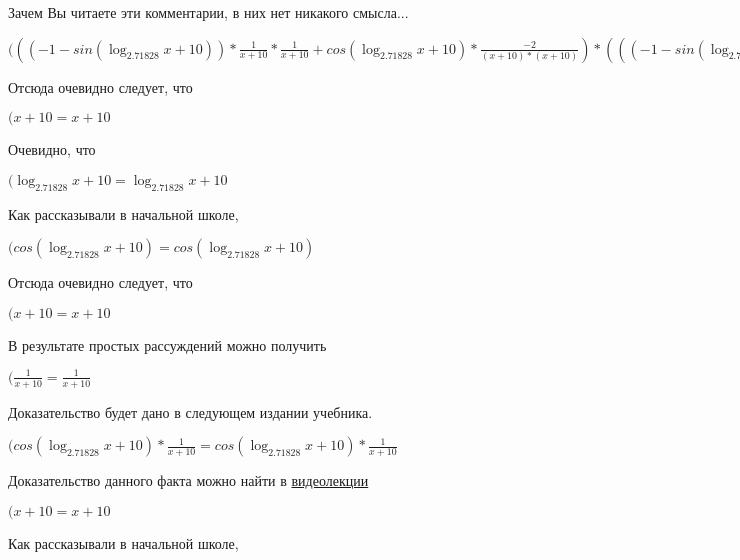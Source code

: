 \documentclass[12pt,a4paper,fleqn]{article}
\theoremstyle{definition}
\begin{document}
Зачем Вы читаете эти комментарии, в них нет никакого смысла...

$((( -1  - sin(\log_{ 2.71828 }{ x  +  10 })) * \frac{ 1 }{ x  +  10 }
 * \frac{ 1 }{ x  +  10 }
 + cos(\log_{ 2.71828 }{ x  +  10 }) * \frac{ -2 }{( x  +  10 ) * ( x  +  10 )}
) * ((( -1  - sin(\log_{ 2.71828 }{ x  +  10 })) * \frac{ 1 }{ x  +  10 }
 * \frac{ 1 }{ x  +  10 }
 + cos(\log_{ 2.71828 }{ x  +  10 }) * \frac{ -2 }{( x  +  10 ) * ( x  +  10 )}
) * { 3 }^{sin(\log_{ 2.71828 }{ x  +  10 })} + cos(\log_{ 2.71828 }{ x  +  10 }) * \frac{ 1 }{ x  +  10 }
 * cos(\log_{ 2.71828 }{ x  +  10 }) * \frac{ 1 }{ x  +  10 }
 * { 3 }^{sin(\log_{ 2.71828 }{ x  +  10 })}) = (( -1  - sin(\log_{ 2.71828 }{ x  +  10 })) * \frac{ 1 }{ x  +  10 }
 * \frac{ 1 }{ x  +  10 }
 + cos(\log_{ 2.71828 }{ x  +  10 }) * \frac{ -2 }{( x  +  10 ) * ( x  +  10 )}
) * ((( -1  - sin(\log_{ 2.71828 }{ x  +  10 })) * \frac{ 1 }{ x  +  10 }
 * \frac{ 1 }{ x  +  10 }
 + cos(\log_{ 2.71828 }{ x  +  10 }) * \frac{ -2 }{( x  +  10 ) * ( x  +  10 )}
) * { 3 }^{sin(\log_{ 2.71828 }{ x  +  10 })} + cos(\log_{ 2.71828 }{ x  +  10 }) * \frac{ 1 }{ x  +  10 }
 * cos(\log_{ 2.71828 }{ x  +  10 }) * \frac{ 1 }{ x  +  10 }
 * { 3 }^{sin(\log_{ 2.71828 }{ x  +  10 })})$

Отсюда очевидно следует, что

$( x  +  10  =  x  +  10 $

Очевидно, что

$(\log_{ 2.71828 }{ x  +  10 } = \log_{ 2.71828 }{ x  +  10 }$

Как рассказывали в начальной школе,

$(cos(\log_{ 2.71828 }{ x  +  10 }) = cos(\log_{ 2.71828 }{ x  +  10 })$

Отсюда очевидно следует, что

$( x  +  10  =  x  +  10 $

В результате простых рассуждений можно получить

$(\frac{ 1 }{ x  +  10 }
 = \frac{ 1 }{ x  +  10 }
$

Доказательство будет дано в следующем издании учебника.

$(cos(\log_{ 2.71828 }{ x  +  10 }) * \frac{ 1 }{ x  +  10 }
 = cos(\log_{ 2.71828 }{ x  +  10 }) * \frac{ 1 }{ x  +  10 }
$

Доказательство данного факта можно найти в \href{https://www.youtube.com/watch?v=dQw4w9WgXcQ}{видеолекции}

$( x  +  10  =  x  +  10 $

Как рассказывали в начальной школе,
\end{document}
